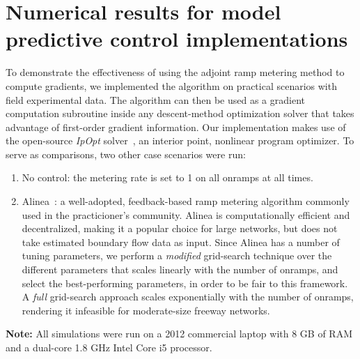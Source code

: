 \section{Numerical results for model predictive control implementations\label{sec:Numerical-results-for}}

To demonstrate the effectiveness of using the adjoint ramp metering
method to compute gradients, we implemented the algorithm on practical scenarios with field experimental data.
The algorithm can then be used as a gradient computation subroutine
inside any descent-method optimization solver that takes advantage
of first-order gradient information. Our implementation makes use
of the open-source \emph{IpOpt} solver~\cite{Andreas2005}, an interior point, nonlinear program optimizer. To serve
as comparisons, two other case scenarios were run:
\begin{enumerate}
	\item No control: the metering rate is set to 1 on all onramps at all times.
	\item Alinea~\cite{Papageorgiou1991}: a well-adopted, feedback-based ramp metering
	algorithm commonly used in the practicioner's community. Alinea is computationally efficient and decentralized,
	making it a popular choice for large networks, but does not take estimated
	boundary flow data as input. Since Alinea has a number of tuning parameters,
	we perform a \emph{modified} grid-search technique over the different
	parameters that scales linearly with the number of onramps, and select
	the best-performing parameters, in order to be fair to this framework. A \emph{full} grid-search approach
	scales exponentially with the number of onramps, rendering it infeasible
	for moderate-size freeway networks.
\end{enumerate}

\textbf{Note: } All simulations were run on a 2012 commercial laptop with 8 GB of RAM and a dual-core 1.8 GHz Intel Core i5 processor.

